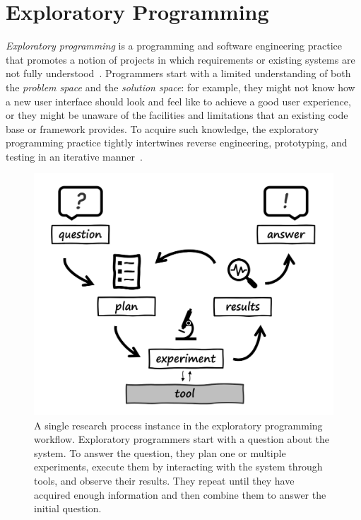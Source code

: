 
\section{Exploratory Programming}
\label{sec:background/exp}

\emph{Exploratory programming} is a programming and software engineering practice that promotes a notion of projects in which requirements or existing systems are not fully understood~\cite{sandberg1988smalltalk,kery2017exploring,rein2018exploratory}.
Programmers start with a limited understanding of both the \emph{problem space} and the \emph{solution space}:
for example, they might not know how a new user interface should look and feel like to achieve a good user experience, or they might be unaware of the facilities and limitations that an existing code base or framework provides.
To acquire such knowledge, the exploratory programming practice tightly intertwines reverse engineering, prototyping, and testing in an iterative manner~\cite{taeumel2022pattern}.

\begin{figure}
	\centering
	\includegraphics[width=.7\textwidth]{01_exp/simple_process.png}
	\caption[A single research process in the exploratory programming workflow.]{
		A single research process instance in the exploratory programming workflow.
		Exploratory programmers start with a question about the system.
		To answer the question, they plan one or multiple experiments, execute them by interacting with the system through tools, and observe their results.
		They repeat until they have acquired enough information and then combine them to answer the initial question.
	}
	\label{fig:background/exp/simple_process}
\end{figure}


